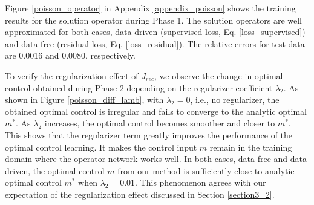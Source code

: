 \documentclass[letterpaper]{article}
\begin{document}
Figure \ref{poisson_operator} in Appendix \ref{appendix_poisson} shows the training results for the solution operator during Phase 1. The solution operators are well approximated for both cases, data-driven (supervised loss, Eq. \eqref{loss_supervised}) and data-free (residual loss, Eq. \eqref{loss_residual}). The relative errors for test data are 0.0016 and 0.0080, respectively.

To verify the regularization effect of $J_{rec}$, we observe the change in optimal control obtained during Phase 2 depending on the regularizer coefficient $\lambda_2$. As shown in Figure \ref{poisson_diff_lamb}, with $\lambda_2=0$, i.e., no regularizer, the obtained optimal control is irregular and fails to converge to the analytic optimal $m^*$. As $\lambda_2$ increases, the optimal control becomes smoother and closer to $m^*$. This shows that the regularizer term greatly improves the performance of the optimal control learning. It makes the control input $m$ remain in the training domain where the operator network works well. In both cases, data-free and data-driven, the optimal control $m$ from our method is sufficiently close to analytic optimal control $m^*$ when $\lambda_2=0.01$. This phenomenon agrees with our expectation of the regularization effect discussed in Section \ref{section3_2}.
\end{document}
